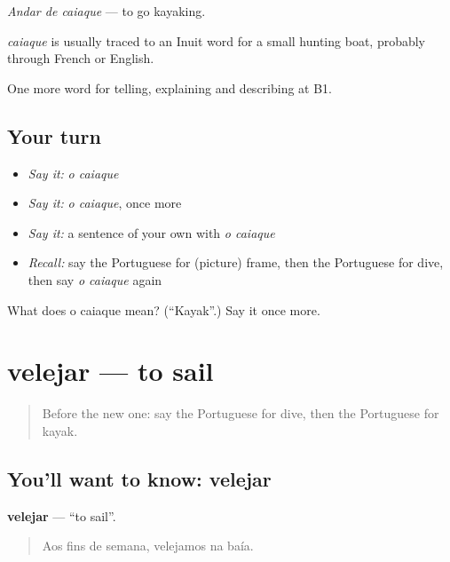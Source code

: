 \emph{Andar de caiaque} — to go kayaking.

\begin{cousinweb}
\emph{caiaque} is usually traced to an Inuit word for a small hunting boat, probably through French or English.
\end{cousinweb}

\begin{grammarlens}[title={What you've built}]
One more word for telling, explaining and describing at B1.
\end{grammarlens}

\subsection*{Your turn}
\begin{itemize}
\raggedright
  \item \emph{Say it:} \emph{o caiaque}
  \item \emph{Say it:} \emph{o caiaque}, once more
  \item \emph{Say it:} a sentence of your own with \emph{o caiaque}
  \item \emph{Recall:} say the Portuguese for (picture) frame, then the Portuguese for dive, then say \emph{o caiaque} again
\end{itemize}

\begin{tcolorbox}[breakable,colback=teal!4,colframe=teal!35!black,title={Before you move on}]
What does o caiaque mean? (\textquotedblleft{}Kayak\textquotedblright{}.) Say it once more.
\end{tcolorbox}
\section[velejar]{velejar — to sail}

\label{lesson:PT-C506-velejar}



\begin{quote}
Before the new one: say the Portuguese for dive, then the Portuguese for kayak.
\end{quote}

\subsection*{You'll want to know: velejar}
\textbf{velejar} — \textquotedblleft{}to sail\textquotedblright{}.

\begin{quote}
Aos fins de semana, velejamos na baía.
\end{quote}

